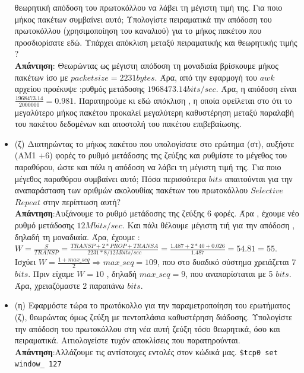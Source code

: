 \documentclass{article}%
\begin{document}
\begin{itemize}
θεωρητική απόδοση του πρωτοκόλλου να λάβει τη μέγιστη τιμή της. Για ποιο μήκος πακέτων
συμβαίνει αυτό; Υπολογίστε πειραματικά την απόδοση του πρωτοκόλλου (χρησιμοποίηση του
καναλιού) για το μήκος πακέτου που προσδιορίσατε εδώ. Υπάρχει απόκλιση μεταξύ πειραματικής
και θεωρητικής τιμής $?$\\
\textbf{Απάντηση}: Θεωρώντας ως μέγιστη απόδοση τη μοναδιαία βρίσκουμε μήκος πακέτων ίσο με $packetsize=2231 bytes$. Άρα, από την εφαρμογή του $awk$ αρχείου προέκυψε :ρυθμός μετάδοσης $1968473.14 bits/sec$. Άρα, η απόδοση είναι $\frac{1968473.14}{2000000}=0.981$. Παρατηρούμε κι εδώ απόκλιση , η οποία οφείλεται στο ότι το μεγαλύτερο μήκος πακέτου προκαλεί μεγαλύτερη καθυστέρηση μεταξύ παραλαβή του πακέτου δεδομένων και αποστολή του πακέτου επιβεβαίωσης.\\
\item	(ζ) Διατηρώντας το μήκος πακέτου που υπολογίσατε στο ερώτημα (στ), αυξήστε (AM1
+6) φορές το
ρυθμό μετάδοσης της ζεύξης και ρυθμίστε το μέγεθος του παραθύρου, ώστε και πάλι η απόδοση να
λάβει τη μέγιστη τιμή της. Για ποιο μέγεθος παραθύρου συμβαίνει αυτό; Πόσα περισσότερα $bits$
απαιτούνται για την αναπαράσταση των αριθμών ακολουθίας πακέτων του πρωτοκόλλου $Selective$
$Repeat$ στην περίπτωση αυτή$?$\\
\textbf{Απάντηση}:Αυξάνουμε το ρυθμό μετάδοσης της ζεύξης 6 φορές. Άρα , έχουμε νέο ρυθμό μετάδοσης $12Mbits/sec$. Και πάλι θέλουμε μέγιστη τιή για την απόδοση , δηλαδή τη μοναδιαία. Άρα, έχουμε : $W=\frac{S}{TRANSP}=\frac{TRANSP+2*PROP+TRANSA}{2231*8/12Mbits/sec}= \frac{1.487+2*40+0.026}{1.487}=54.81=55$. Ισχύει $W=\frac{1+max\_seq}{2}\Rightarrow max\_seq=109$, που στο δυαδικό σύστημα χρειάζεται 7 $bits$. Πριν είχαμε $W=10$ , δηλαδή $max\_seq=9$, που αναπαρίσταται με 5 $bits$. Άρα, χρειαζόμαστε 2 παραπάνω $bits$.\\
\item	(η) Εφαρμόστε τώρα το πρωτόκολλο για την παραμετροποίηση του ερωτήματος (ζ), θεωρώντας όμως
ζεύξη με πενταπλάσια καθυστέρηση διάδοσης. Υπολογίστε την απόδοση του πρωτοκόλλου στη νέα
αυτή ζεύξη τόσο θεωρητικά, όσο και πειραματικά. Αιτιολογείστε τυχόν αποκλίσεις που
παρατηρούνται.\\ 
\textbf{Απάντηση}:Αλλάζουμε τις αντίστοιχες εντολές στον κώδικά μας. \verb|$tcp0 set window_ 127|\\


\end{itemize}
\end{document}
